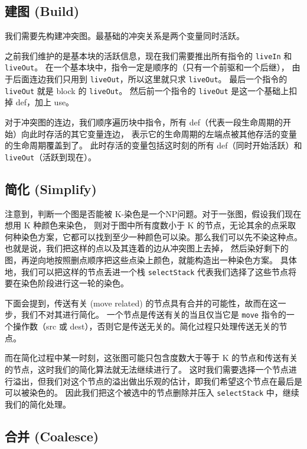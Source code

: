 \subsection{建图 (Build)}

我们需要先构建冲突图。最基础的冲突关系是两个变量同时活跃。

之前我们维护的是基本块的活跃信息，现在我们需要推出所有指令的 \texttt{liveIn} 和 \texttt{liveOut}。
在一个基本块中，指令一定是顺序的（只有一个前驱和一个后继），
由于后面连边我们只用到 \texttt{liveOut}，所以这里就只求 \texttt{liveOut}。
最后一个指令的 \texttt{liveOut} 就是 block 的 \texttt{liveOut}。
然后前一个指令的 \texttt{liveOut} 是这一个基础上扣掉 def，加上 use。

对于冲突图的连边，我们顺序遍历块中指令，所有 def（代表一段生命周期的开始）向此时存活的其它变量连边，
表示它的生命周期的左端点被其他存活的变量的生命周期覆盖到了。
此时存活的变量包括这时刻的所有 def（同时开始活跃）和 \texttt{liveOut}（活跃到现在）。

\subsection{简化 (Simplify)}

注意到，判断一个图是否能被 K-染色是一个NP问题。对于一张图，假设我们现在想用 K 种颜色来染色，
则对于图中所有度数小于 K 的节点，无论其余的点采取何种染色方案，它都可以找到至少一种颜色可以染。那么我们可以先不染这种点。
也就是说，我们把这样的点以及其连着的边从冲突图上去掉，
然后染好剩下的图，再逆向地按照删点顺序把这些点染上颜色，就能构造出一种染色方案。
具体地，我们可以把这样的节点丢进一个栈 \texttt{selectStack} 代表我们选择了这些节点将要在染色阶段进行这一轮的染色。

下面会提到，传送有关 (move related) 的节点具有合并的可能性，故而在这一步，我们不对其进行简化。
一个节点是传送有关的当且仅当它是 \texttt{move} 指令的一个操作数（src 或 dest），否则它是传送无关的。简化过程只处理传送无关的节点。

而在简化过程中某一时刻，这张图可能只包含度数大于等于 K 的节点和传送有关的节点，这时我们的简化算法就无法继续进行了。
这时我们需要选择一个节点进行溢出，但我们对这个节点的溢出做出乐观的估计，即我们希望这个节点在最后是可以被染色的。
因此我们把这个被选中的节点删除并压入 \texttt{selectStack} 中，继续我们的简化处理。

\subsection{合并 (Coalesce)}


